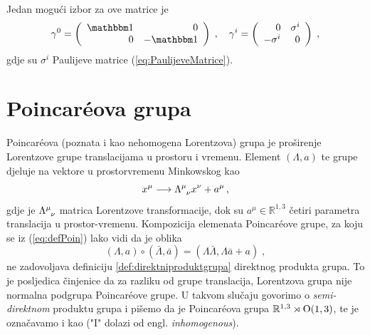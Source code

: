 Jedan mogući izbor za ove matrice je
\begin{equation}
\gamma^0 = \left(\begin{array}{rr} \Eins & 0 \\
                        0 & -\Eins \end{array}\right)
\;, \quad
\gamma^i = \left(\begin{array}{rr} 0 & \sigma^i \\
                        -\sigma^i & 0 \end{array}\right) \;,
\end{equation}
gdje su $\sigma^i$ Paulijeve matrice (\ref{eq:PaulijeveMatrice}).

\section{Poincar\'{e}ova grupa}


Poincar\'{e}ova (poznata i kao nehomogena Lorentzova) grupa je
proširenje Lorentzove grupe translacijama u prostoru
i vremenu. Element $(\Lambda, a)$ te grupe djeluje na vektore u prostorvremenu
Minkowskog kao
\begin{equation}
  x^\mu \longrightarrow \tensor{\Lambda}{^\mu_\nu} x^\nu + a^\mu \,,
\label{eq:defPoin}
\end{equation}
gdje je $\tensor{\Lambda}{^\mu_\nu}$ matrica Lorentzove transformacije,
dok su $a^\mu \in \mathbb{R}^{1,3}$ četiri parametra translacija u prostor-vremenu.
Kompozicija elemenata Poincar\'{e}ove grupe, za koju se iz (\ref{eq:defPoin}) 
lako vidi da je oblika
\begin{equation}
    (\Lambda, a) \circ (\bar{\Lambda}, \bar{a})
    = (\Lambda \bar{\Lambda}, \Lambda\bar{a} + a) \;,
\end{equation}
ne zadovoljava definiciju \ref{def:direktniproduktgrupa} direktnog produkta
grupa. To je posljedica činjenice da za razliku od grupe translacija,
Lorentzova grupa nije normalna podgrupa Poincar\'{e}ove grupe.
U takvom slučaju govorimo o \emph{semi-direktnom} produktu grupa
i pišemo da je Poincar\'{e}ova grupa $\mathbb{R}^{1,3} \rtimes \mathrm{O}(1,3)$,
te je označavamo i kao  ("I" dolazi od engl. \emph{inhomogenous}).

